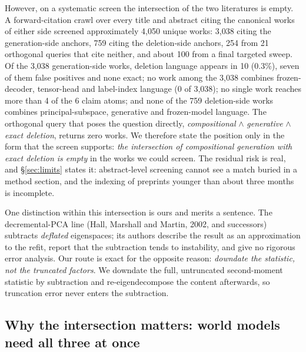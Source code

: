 \documentclass{article} %
\begin{document}
However, on a systematic screen the intersection of the two literatures is empty. A
forward-citation crawl over every title and abstract citing the canonical works of either side
screened approximately 4,050 unique works: 3,038 citing the generation-side anchors, 759 citing
the deletion-side anchors, 254 from 21 orthogonal queries that cite neither, and about 100 from
a final targeted sweep. %
Of the 3,038 generation-side works, deletion language appears in 10 (0.3\%), seven of them
false positives and none exact; no work among the 3,038 combines frozen-decoder, tensor-head
and label-index language (0 of 3,038); no single work reaches more than 4 of the 6 claim atoms;
and none of the 759 deletion-side works combines principal-subspace, generative and
frozen-model language. %
The orthogonal query that poses the question directly, \emph{compositional} $\wedge$
\emph{generative} $\wedge$ \emph{exact deletion}, returns zero works.
We therefore state the position only in the form that the screen supports: \emph{the
intersection of compositional generation with exact deletion is empty} in the works we could
screen. The residual risk is real, and \S\ref{sec:limits} states it: abstract-level screening
cannot see a match buried in a method section, and the indexing of preprints younger than about
three months is incomplete.

One distinction within this intersection is ours and merits a sentence. The decremental-PCA
line (Hall, Marshall and Martin, 2002, and successors) subtracts \emph{deflated} eigenspaces;
its authors describe the result as an approximation to the refit, report that the subtraction
tends to instability, and give no rigorous error analysis. Our route is exact for the opposite
reason: \emph{downdate the statistic, not the truncated factors}. We downdate the full,
untruncated second-moment statistic by subtraction and re-eigendecompose the content
afterwards, so truncation error never enters the subtraction.

\subsection{Why the intersection matters: world models need all three at once}
\label{sec:why}
\end{document}
